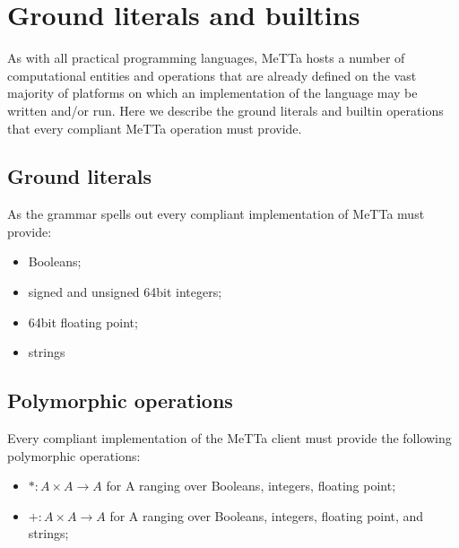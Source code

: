 \section{Ground literals and builtins}
As with all practical programming languages, MeTTa hosts a number of computational entities and operations that are already defined on the vast majority of platforms on which an implementation of the language may be written and/or run. Here we describe the ground literals and builtin operations that every compliant MeTTa operation must provide.
\subsection{Ground literals}
As the grammar spells out every compliant implementation of MeTTa must provide:

\begin{itemize}
  \item Booleans;
  \item signed and unsigned 64bit integers;
  \item 64bit floating point;
  \item strings
\end{itemize}

\subsection{Polymorphic operations}
Every compliant implementation of the MeTTa client must provide the following polymorphic operations:

\begin{itemize}
  \item $* : A \times A \rightarrow A$ for A ranging over Booleans, integers, floating point;
  \item $+ : A \times A \rightarrow A$ for A ranging over Booleans, integers, floating point, and strings;
\end{itemize}

